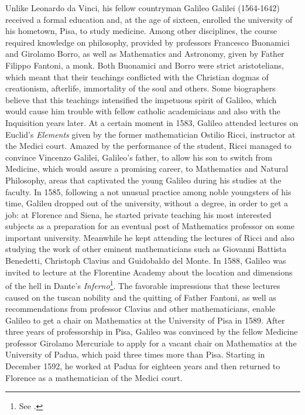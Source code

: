 Unlike Leonardo da Vinci, his fellow countryman Galileo Galilei (1564-1642) received a formal education and, at the age of sixteen, enrolled the university of his hometown, Pisa, to study medicine. Among other disciplines, the course required knowledge on philosophy, provided by professors Francesco Buonamici and Girolamo Borro, as well as Mathematics and Astronomy, given by Father Filippo Fantoni, a monk. Both Buonamici and Borro were strict aristotelians, which meant that their teachings conflicted with the Christian dogmas of creationism, afterlife, immortality of the soul and others. Some biographers believe that this teachings intensified the impetuous spirit of Galileo, which would cause him trouble with fellow catholic academicians and also with the Inquisition years later. At a certain moment in 1583, Galileo attended lectures on Euclid's \emph{Elements} given by the former mathematician Ostilio Ricci, instructor at the Medici court. Amazed by the performance of the student, Ricci managed to convince Vincenzo Galilei, Galileo's father, to allow his son to switch from Medicine, which would assure a promising career, to Mathematics and Natural Philosophy, areas that captivated the young Galileo during his studies at the faculty. In 1585, following a not unusual practice among noble youngsters of his time, Galileu dropped out of the university, without a degree, in order to get a job: at Florence and Siena, he started private teaching his most interested subjects as a preparation for an eventual post of Mathematics professor on some important university. Meanwhile he kept attending the lectures of Ricci and also studying the work of other eminent mathematicians such as Giovanni Battista Benedetti, Christoph Clavius and Guidobaldo del Monte. In 1588, Galileo was invited to lecture at the Florentine Academy about the location and dimensions of the hell in Dante's \emph{Inferno}\footnote{See \cite{wallace_1998_1}.}. The favorable impressions that these lectures caused on the tuscan nobility and the quitting of Father Fantoni, as well as recommendations from professor Clavius and other mathematicians, enable Galileo to get a chair on Mathematics at the University of Pisa in 1589. After three years of professorship in Pisa, Galileo was convinced by the fellow Medicine professor Girolamo Mercuriale to apply for a vacant chair on Mathematics at the University of Padua, which paid three times more than Pisa. Starting in December 1592, he worked at Padua for eighteen years and then returned to Florence as a mathematician of the Medici court.    

